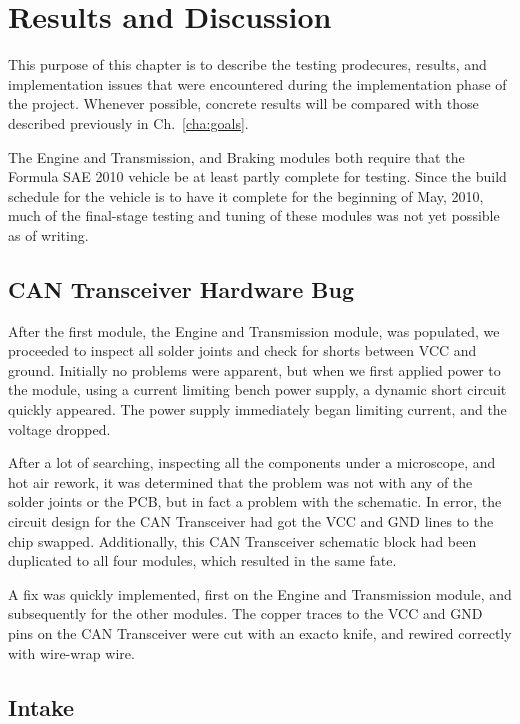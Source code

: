 \chapter{Results and Discussion}

This purpose of this chapter is to describe the testing prodecures, results, and implementation issues that were encountered during the implementation phase of the project. Whenever possible, concrete results will be compared with those described previously in Ch.\ \ref{cha:goals}.

The Engine and Transmission, and Braking modules both require that the Formula SAE 2010 vehicle be at least partly complete for testing. Since the build schedule for the vehicle is to have it complete for the beginning of May, 2010, much of the final-stage testing and tuning of these modules was not yet possible as of writing.

\section{CAN Transceiver Hardware Bug}

After the first module, the Engine and Transmission module, was populated, we proceeded to inspect all solder joints and check for shorts between VCC and ground. Initially no problems were apparent, but when we first applied power to the module, using a current limiting bench power supply, a dynamic short circuit quickly appeared. The power supply immediately began limiting current, and the voltage dropped.

After a lot of searching, inspecting all the components under a microscope, and hot air rework, it was determined that the problem was not with any of the solder joints or the PCB, but in fact a problem with the schematic. In error, the circuit design for the CAN Transceiver had got the VCC and GND lines to the chip swapped. Additionally, this CAN Transceiver schematic block had been duplicated to all four modules, which resulted in the same fate.

A fix was quickly implemented, first on the Engine and Transmission module, and subsequently for the other modules. The copper traces to the VCC and GND pins on the CAN Transceiver were cut with an exacto knife, and rewired correctly with wire-wrap wire.




\section{Intake}



